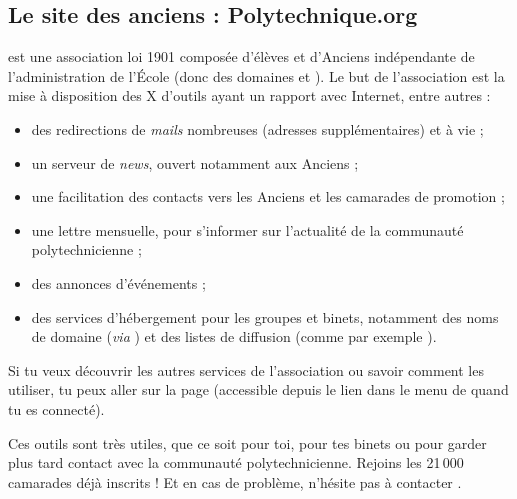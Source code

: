 \subsection{Le site des anciens : Polytechnique.org}

 est une association loi 1901 composée d'élèves et d'Anciens
 indépendante de l'administration de l'École (donc des domaines 
 et ). Le but de l'association est la mise à disposition des X d'outils
ayant un rapport avec Internet, entre autres :

\begin{itemize}
  \item des redirections de \emph{mails} nombreuses (adresses supplémentaires) et à vie ;
  \item un serveur de \emph{news}, ouvert notamment aux Anciens ;
  \item une facilitation des contacts vers les Anciens et les camarades de promotion ;
  \item une lettre mensuelle, pour s'informer sur l'actualité de la communauté polytechnicienne ;
  \item des annonces d'événements ;
  \item des services d'hébergement pour les groupes et binets, notamment des noms de domaine (\emph{via} ) et des listes de diffusion (comme par exemple ).
\end{itemize}
Si tu veux découvrir les autres services de l'association ou savoir
comment les utiliser, tu peux aller sur la page
 (accessible depuis
le lien  dans le menu de 
quand tu es connecté).


 Ces outils sont très utiles, que
ce soit pour toi, pour tes binets ou pour garder plus tard contact avec la communauté polytechnicienne. Rejoins
les 21\,000 camarades déjà inscrits ! Et en cas de problème, n'hésite pas à contacter
.
